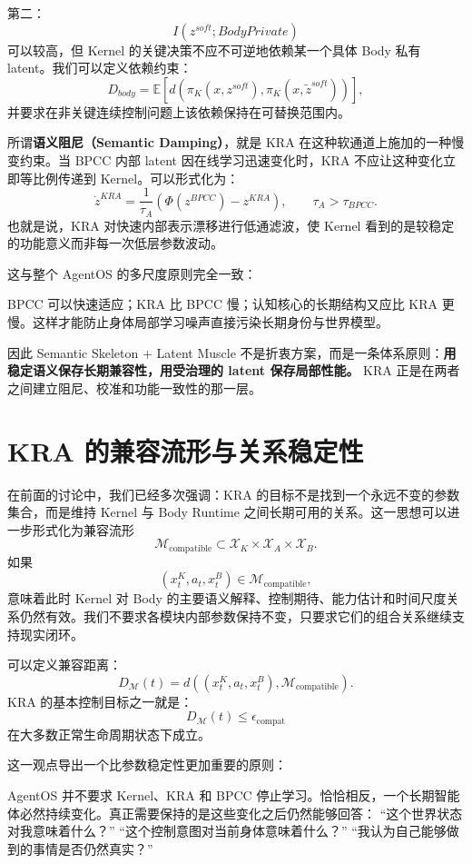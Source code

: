第二：
\[
I(z^{soft};BodyPrivate)
\]
可以较高，但 Kernel 的关键决策不应不可逆地依赖某一个具体 Body 私有 latent。我们可以定义依赖约束：
\[
D_{body}
=
\mathbb E
\left[
d
\left(
\pi_K(x,z^{soft}),
\pi_K(x,\tilde z^{soft})
\right)
\right],
\]
并要求在非关键连续控制问题上该依赖保持在可替换范围内。

所谓\textbf{语义阻尼（Semantic Damping）}，就是 KRA 在这种软通道上施加的一种慢变约束。当 BPCC 内部 latent 因在线学习迅速变化时，KRA 不应让这种变化立即等比例传递到 Kernel。可以形式化为：
\[
\dot z^{KRA}
=
\frac{1}{\tau_A}
\left(
\Phi(z^{BPCC})
-
z^{KRA}
\right),
\qquad
\tau_A>\tau_{BPCC}.
\]
也就是说，KRA 对快速内部表示漂移进行低通滤波，使 Kernel 看到的是较稳定的功能意义而非每一次低层参数波动。

这与整个 AgentOS 的多尺度原则完全一致：
\begin{statementbox}
\centering
{}
\end{statementbox}
BPCC 可以快速适应；KRA 比 BPCC 慢；认知核心的长期结构又应比 KRA 更慢。这样才能防止身体局部学习噪声直接污染长期身份与世界模型。

因此 Semantic Skeleton + Latent Muscle 不是折衷方案，而是一条体系原则：\textbf{用稳定语义保存长期兼容性，用受治理的 latent 保存局部性能。} KRA 正是在两者之间建立阻尼、校准和功能一致性的那一层。

\section{KRA 的兼容流形与关系稳定性}
\label{sec:kra-compatibility-manifold}

在前面的讨论中，我们已经多次强调：KRA 的目标不是找到一个永远不变的参数集合，而是维持 Kernel 与 Body Runtime 之间长期可用的关系。这一思想可以进一步形式化为兼容流形
\[
\boxed{
\mathcal M_{\mathrm{compatible}}
\subset
\mathcal X_K
\times
\mathcal X_A
\times
\mathcal X_B.
}
\]
如果
\[
(x^K_t,a_t,x^B_t)
\in
\mathcal M_{\mathrm{compatible}},
\]
意味着此时 Kernel 对 Body 的主要语义解释、控制期待、能力估计和时间尺度关系仍然有效。我们不要求各模块内部参数保持不变，只要求它们的组合关系继续支持现实闭环。

可以定义兼容距离：
\[
D_{\mathcal M}(t)
=
d
\left(
(x^K_t,a_t,x^B_t),
\mathcal M_{\mathrm{compatible}}
\right).
\]
KRA 的基本控制目标之一就是：
\[
\boxed{
D_{\mathcal M}(t)
\leq
\epsilon_{\mathrm{compat}}
}
\]
在大多数正常生命周期状态下成立。

这一观点导出一个比参数稳定性更加重要的原则：
\begin{statementbox}
\centering
{}
\end{statementbox}
AgentOS 并不要求 Kernel、KRA 和 BPCC 停止学习。恰恰相反，一个长期智能体必然持续变化。真正需要保持的是这些变化之后仍然能够回答：
``这个世界状态对我意味着什么？''
``这个控制意图对当前身体意味着什么？''
``我认为自己能够做到的事情是否仍然真实？''

